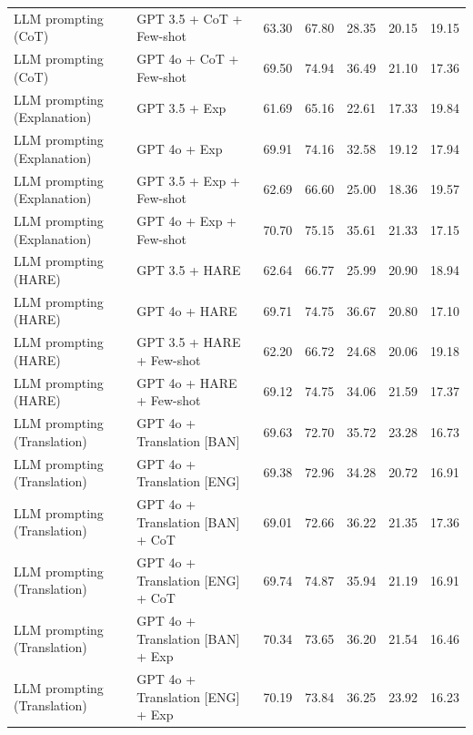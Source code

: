 \begin{tabular}{llrrrrr}
LLM prompting (CoT) & GPT 3.5 + CoT + Few-shot & 63.30 & 67.80 & 28.35 & 20.15 & 19.15 \\
LLM prompting (CoT) & GPT 4o + CoT + Few-shot & 69.50 & 74.94 & 36.49 & 21.10 & 17.36 \\
LLM prompting (Explanation) & GPT 3.5 + Exp & 61.69 & 65.16 & 22.61 & 17.33 & 19.84 \\
LLM prompting (Explanation) & GPT 4o + Exp & 69.91 & 74.16 & 32.58 & 19.12 & 17.94 \\
LLM prompting (Explanation) & GPT 3.5 + Exp + Few-shot & 62.69 & 66.60 & 25.00 & 18.36 & 19.57 \\
LLM prompting (Explanation) & GPT 4o + Exp + Few-shot & 70.70 & 75.15 & 35.61 & 21.33 & 17.15 \\
LLM prompting (HARE) & GPT 3.5 + HARE & 62.64 & 66.77 & 25.99 & 20.90 & 18.94 \\
LLM prompting (HARE) & GPT 4o + HARE & 69.71 & 74.75 & 36.67 & 20.80 & 17.10 \\
LLM prompting (HARE) & GPT 3.5 + HARE + Few-shot & 62.20 & 66.72 & 24.68 & 20.06 & 19.18 \\
LLM prompting (HARE) & GPT 4o + HARE + Few-shot & 69.12 & 74.75 & 34.06 & 21.59 & 17.37 \\
LLM prompting (Translation) & GPT 4o + Translation [BAN] & 69.63 & 72.70 & 35.72 & 23.28 & 16.73 \\
LLM prompting (Translation) & GPT 4o + Translation [ENG] & 69.38 & 72.96 & 34.28 & 20.72 & 16.91 \\
LLM prompting (Translation) & GPT 4o + Translation [BAN] + CoT & 69.01 & 72.66 & 36.22 & 21.35 & 17.36 \\
LLM prompting (Translation) & GPT 4o + Translation [ENG] + CoT & 69.74 & 74.87 & 35.94 & 21.19 & 16.91 \\
LLM prompting (Translation) & GPT 4o + Translation [BAN] + Exp & 70.34 & 73.65 & 36.20 & 21.54 & 16.46 \\
LLM prompting (Translation) & GPT 4o + Translation [ENG] + Exp & 70.19 & 73.84 & 36.25 & 23.92 & 16.23 \\
\bottomrule
\end{tabular}
